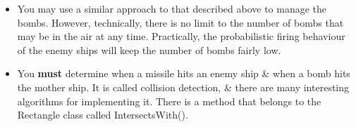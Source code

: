 \documentclass{article}
\begin{document}
\begin{itemize}
    \item You may use a similar approach to that described above to manage the bombs. However, technically, there is no limit to the number of bombs that may be in the air at any time. Practically, the probabilistic firing behaviour of the enemy ships will keep the number of bombs fairly low.
    \item You \textbf{must} determine when a missile hits an enemy ship \& when a bomb hits the mother ship. It is called collision detection, \& there are many interesting algorithms for implementing it. There is a method that belongs to the Rectangle class called IntersectsWith().
\end{itemize}
\end{document}

